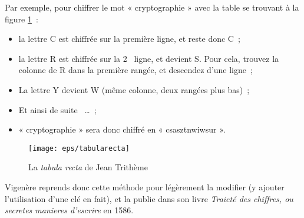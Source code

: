 Par exemple, pour chiffrer le mot « cryptographie » avec la table se
trouvant à la figure \ref{fig:TabulaRecta}~: 
\begin{itemize}
  \item la lettre C est chiffrée sur la première ligne, et reste
    donc C~;
  \item la lettre R est chiffrée sur la 2\ieme~ ligne, et devient
    S. Pour cela, trouvez la colonne de R dans la première rangée, et
    descendez d'une ligne~;
  \item La lettre Y devient W (même colonne, deux rangées plus bas)~;
  \item Et ainsi de suite ~\dots~;
  \item « cryptographie » sera donc chiffré en « csasztnwiwsur ».
\end{itemize}

\begin{figure}[h]
  \begin{center}



      
      

    \texttt{[image: eps/tabularecta]}
  \end{center}
  \caption{La \emph{tabula recta} de Jean Trithème}
  \label{fig:TabulaRecta}
\end{figure}

Vigenère reprends donc cette méthode pour légèrement la modifier (y
ajouter l'utilisation d'une clé en fait), et la publie dans son livre
\emph{Traicté des chiffres, ou secretes
  manieres d'escrire} en 1586. \\

